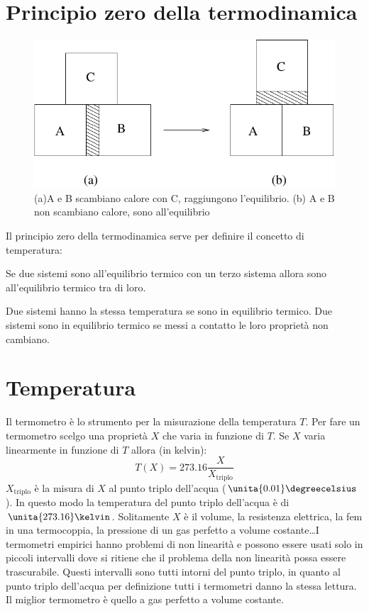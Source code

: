 \section{Principio zero della termodinamica}
\begin{figure}[htbp]
\centering
\includegraphics[scale=0.5]{immagini/fisica1/principio_zero}
\caption{(a)A e B scambiano calore con C, raggiungono l'equilibrio. (b) A e B non scambiano calore, sono all'equilibrio}
\end{figure}
Il principio zero della termodinamica serve per definire il concetto di temperatura:
\begin{Pri}
Se due sistemi sono all'equilibrio termico con un terzo sistema allora sono all'equilibrio termico tra di loro.

Due sistemi hanno la stessa temperatura se sono in equilibrio termico. Due sistemi sono in equilibrio termico se messi a contatto le loro proprietà non cambiano.
\end{Pri}

\section{Temperatura}
Il termometro è lo strumento per la misurazione della temperatura $T$. Per fare un termometro scelgo una proprietà $X$ che varia in funzione di $T$. Se $X$ varia linearmente in funzione di $T$ allora (in kelvin):
\begin{equation}
T(X)=273.16\frac{X}{X_\text{triplo}}
\end{equation}
$X_\text{triplo}$ è la misura di $X$ al punto triplo dell'acqua ($\unita{0.01}\degreecelsius$). In questo modo la temperatura del punto triplo dell'acqua è di $\unita{273.16}\kelvin$. Solitamente $X$ è il volume, la resistenza elettrica, la fem in una termocoppia, la pressione di un gas perfetto a volume costante\ldots I termometri empirici hanno problemi di non linearità e possono essere usati solo in piccoli intervalli dove si ritiene che il problema della non linearità possa essere trascurabile. Questi intervalli sono tutti intorni del punto triplo, in quanto al punto triplo dell'acqua per definizione tutti i termometri danno la stessa lettura. Il miglior termometro è quello a gas perfetto a volume costante.


